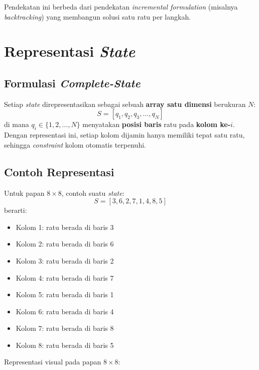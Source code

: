 \documentclass[12pt,a4paper]{article}
\begin{document}
Pendekatan ini berbeda dari pendekatan \textit{incremental formulation} (misalnya \textit{backtracking}) yang membangun solusi satu ratu per langkah.

\section{Representasi \textit{State}}
\label{sec:representasi}

\subsection{Formulasi \textit{Complete-State}}
\label{subsec:complete-state}

Setiap \textit{state} direpresentasikan sebagai sebuah \textbf{array satu dimensi} berukuran $N$:
\[
    S = [q_1, q_2, q_3, \ldots, q_N]
\]
di mana $q_i \in \{1, 2, \ldots, N\}$ menyatakan \textbf{posisi baris} ratu pada \textbf{kolom ke-$i$}. Dengan representasi ini, setiap kolom dijamin hanya memiliki tepat satu ratu, sehingga \textit{constraint} kolom otomatis terpenuhi.

\subsection{Contoh Representasi}
\label{subsec:contoh-representasi}

Untuk papan $8 \times 8$, contoh suatu \textit{state}:
\[
    S = [3, 6, 2, 7, 1, 4, 8, 5]
\]
berarti:
\begin{itemize}
    \item Kolom 1: ratu berada di baris 3
    \item Kolom 2: ratu berada di baris 6
    \item Kolom 3: ratu berada di baris 2
    \item Kolom 4: ratu berada di baris 7
    \item Kolom 5: ratu berada di baris 1
    \item Kolom 6: ratu berada di baris 4
    \item Kolom 7: ratu berada di baris 8
    \item Kolom 8: ratu berada di baris 5
\end{itemize}

Representasi visual pada papan $8 \times 8$:
\end{document}
